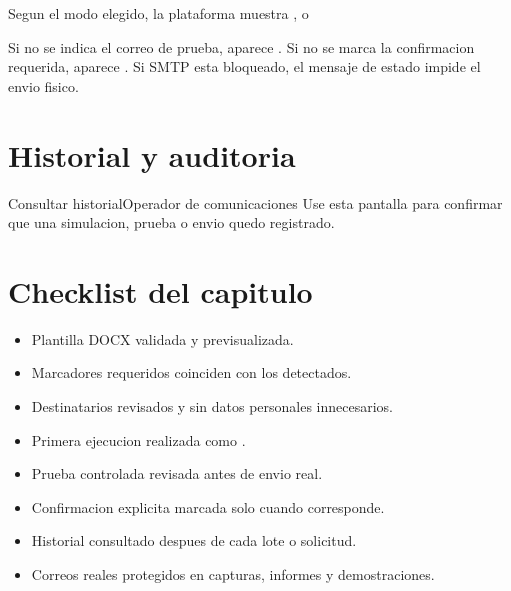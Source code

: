 \begin{resultadoesperado}
Segun el modo elegido, la plataforma muestra ,  o 
\end{resultadoesperado}

\begin{fallas}
Si no se indica el correo de prueba, aparece . Si no se marca la confirmacion requerida, aparece . Si SMTP esta bloqueado, el mensaje de estado impide el envio fisico.
\end{fallas}

\section{Historial y auditoria}


\begin{procedimiento}{Consultar historial}{Operador de comunicaciones}
Use esta pantalla para confirmar que una simulacion, prueba o envio quedo registrado.
\end{procedimiento}


\section{Checklist del capitulo}

\begin{itemize}
    \item Plantilla DOCX validada y previsualizada.
    \item Marcadores requeridos coinciden con los detectados.
    \item Destinatarios revisados y sin datos personales innecesarios.
    \item Primera ejecucion realizada como .
    \item Prueba controlada revisada antes de envio real.
    \item Confirmacion explicita marcada solo cuando corresponde.
    \item Historial consultado despues de cada lote o solicitud.
    \item Correos reales protegidos en capturas, informes y demostraciones.
\end{itemize}
